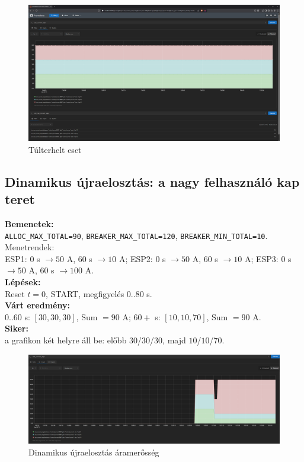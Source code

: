 \begin{figure}[H]
    \centering
    \includegraphics[width=1\textwidth]{figures/túlterhelés_3.png}
    \caption{Túlterhelt eset}
    \label{fig:Túlterhelt}
\end{figure}

\subsection{Dinamikus újraelosztás: a nagy felhasználó kap teret}
\textbf{Bemenetek:}\\ \texttt{ALLOC\_MAX\_TOTAL=90}, \texttt{BREAKER\_MAX\_TOTAL=120}, 
\texttt{BREAKER\_MIN\_TOTAL=10}. Menetrendek: \\
ESP1: \(0\) s \(\to 50\) A, \(60\) s \(\to 10\) A; \;
ESP2: \(0\) s \(\to 50\) A, \(60\) s \(\to 10\) A; \;
ESP3: \(0\) s \(\to 50\) A, \(60\) s \(\to 100\) A.\\
\textbf{Lépések:}\\ Reset \(t{=}0\), START, megfigyelés \(0..80\) s.\\
\textbf{Várt eredmény:}\\ \(0..60\) s: \([30,30,30]\), Sum \(=90\) A; \(60+\) s: \([10,10,70]\), Sum \(=90\) A.\\
\textbf{Siker:}\\ a grafikon két helyre áll be: előbb \(30\)/\(30\)/\(30\), majd \(10\)/\(10\)/\(70\).

\begin{figure}[H]
    \centering
    \includegraphics[width=1\textwidth]{figures/dinamikus újraelosztás_4_1.png}
    \caption{Dinamikus újraelosztás áramerősség}
    \label{fig:dynamic_reallocation_1}
\end{figure}

